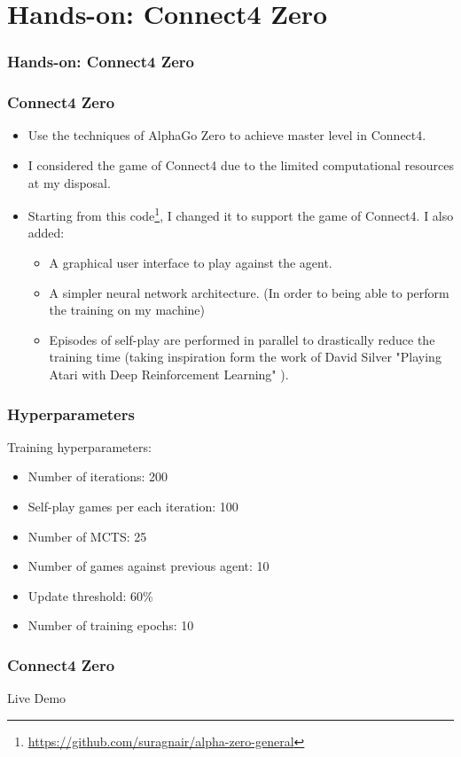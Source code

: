 \documentclass[9pt]{beamer}
\begin{document}
\section{Hands-on: Connect4 Zero}

\begin{frame}
	\frametitle{Hands-on: Connect4 Zero}
	
	\tableofcontents[ 
	currentsubsection, 
	hideothersubsections, 
	sectionstyle=show/shaded,
	]
	
\end{frame}

\begin{frame}
	\frametitle{Connect4 Zero}

	\begin{itemize}
		\item Use the techniques of AlphaGo Zero \cite{silver2017mastering} to achieve master level in Connect4.
		\item I considered the game of Connect4 due to the limited computational resources at my disposal.
		\item Starting from this code\footnote{\url{https://github.com/suragnair/alpha-zero-general}}, I changed it to support the game of Connect4. I also added:
		\begin{itemize}
			\item A graphical user interface to play against the agent.
			\item A simpler neural network architecture. (In order to being able to perform the training on my machine)
			\item Episodes of self-play are performed in parallel to drastically reduce the training time (taking inspiration form the work of David Silver "Playing Atari with Deep Reinforcement Learning" \cite{mnih2013atari}).

		\end{itemize}

	\end{itemize}

\end{frame}


\begin{frame}
	\frametitle{Hyperparameters}
	Training hyperparameters:

	\begin{itemize}
		\item Number of iterations: 200
		\item Self-play games per each iteration: 100
		\item Number of MCTS: 25
		\item Number of games against previous agent: 10
		\item Update threshold: 60\%
		\item Number of training epochs: 10
	\end{itemize}

\end{frame}


\begin{frame}
	\frametitle{Connect4 Zero}
	\Huge{\centerline{Live Demo}}

\end{frame}

\end{document}
